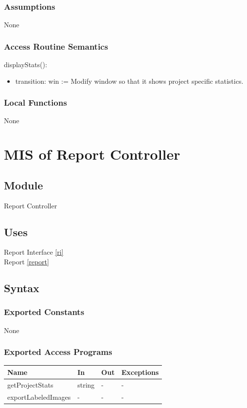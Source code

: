 \documentclass[12pt, titlepage]{article}
\begin{document}
\subsubsection{Assumptions}
None

\subsubsection{Access Routine Semantics}

\noindent displayStats():
\begin{itemize}
\item transition: win := Modify window so that it shows project specific statistics.
\end{itemize}

\subsubsection{Local Functions}
None

\section{MIS of Report Controller} \label{rc}

\subsection{Module}

Report Controller

\subsection{Uses}

Report Interface \ref{ri}\\
Report \ref{report} \\

\subsection{Syntax}

\subsubsection{Exported Constants}
None
\subsubsection{Exported Access Programs}

\begin{center}
\begin{tabular}{p{4cm} p{4cm} p{4cm} p{2cm}}
\hline
\textbf{Name} & \textbf{In} & \textbf{Out} & \textbf{Exceptions} \\
\hline
getProjectStats & string & - & - \\
exportLabeledImages & - & - & - \\
\hline
\end{tabular}
\end{center}
\end{document}
